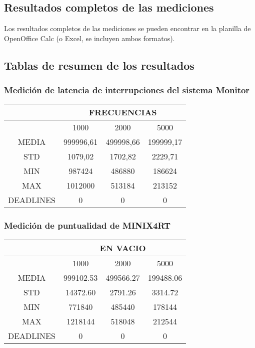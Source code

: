 \subsection{Resultados completos de las mediciones}
Los resultados completos de las mediciones se pueden encontrar en la planilla
de OpenOffice Calc (o Excel, se incluyen ambos formatos).


\subsection{Tablas de resumen de los resultados}

\subsubsection{Medición de latencia de interrupciones del sistema Monitor}
\begin{center}
\begin{tabular}{|c|c|c|c|}
\hline
&\multicolumn{3}{|c|}{FRECUENCIAS}\\
\hline
&1000&2000&5000\\
\hline
MEDIA&999996,61&499998,66&199999,17\\
\hline
STD&1079,02&1702,82&2229,71\\
\hline
MIN&987424&486880&186624\\
\hline
MAX&1012000&513184&213152\\
\hline
DEADLINES&0&0&0\\
\hline
\end{tabular}
\end{center}


\subsubsection{Medición de puntualidad de MINIX4RT}

\begin{center}
\begin{tabular}{|c|c|c|c|}
\hline
&\multicolumn{3}{|c|}{EN VACIO}\\
\hline
&1000&2000&5000\\
\hline
MEDIA&999102.53&499566.27&199488.06\\
\hline
STD&14372.60&2791.26&3314.72\\
\hline
MIN&771840&485440&178144\\
\hline
MAX&1218144&518048&212544\\
\hline
DEADLINES&0&0&0\\
\hline
\end{tabular}
\end{center}

